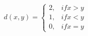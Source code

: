 \begin{equation}\label{eq:non_symmetric_distance_function}
  d(x,y) =
    \begin{cases}
      2, & if x > y \\
      1, & if x < y \\
      0, & if x = y
    \end{cases}
\end{equation}

